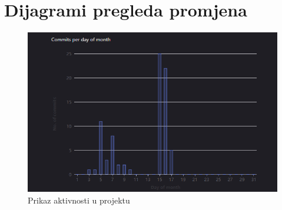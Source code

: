 	
					
					
		\eject
		\section*{Dijagrami pregleda promjena}
		\begin{figure}[H]
			\includegraphics[scale=0.7]{slike/Aktivnost.png}
			\centering
			\caption{Prikaz aktivnosti u projektu}
			\label{fig:promjene}
		          \end{figure}
		
		
	